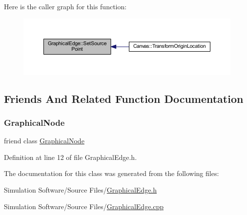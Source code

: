 Here is the caller graph for this function\+:
\nopagebreak
\begin{figure}[H]
\begin{center}
\leavevmode
\includegraphics[width=350pt]{class_graphical_edge_a02acb6e42ac2d6def8a662006db2b1ff_icgraph}
\end{center}
\end{figure}


\subsection{Friends And Related Function Documentation}
\mbox{\label{class_graphical_edge_adc7790177f80355fce81568dcdbf561e}} 
\subsubsection{\texorpdfstring{Graphical\+Node}{GraphicalNode}}
{\footnotesize\ttfamily friend class \hyperlink{class_graphical_node}{Graphical\+Node}\hspace{0.3cm}{\ttfamily [friend]}}



Definition at line 12 of file Graphical\+Edge.\+h.



The documentation for this class was generated from the following files\+:\begin{DoxyCompactItemize}
\item 
Simulation Software/\+Source Files/\hyperlink{_graphical_edge_8h}{Graphical\+Edge.\+h}\item 
Simulation Software/\+Source Files/\hyperlink{_graphical_edge_8cpp}{Graphical\+Edge.\+cpp}\end{DoxyCompactItemize}
